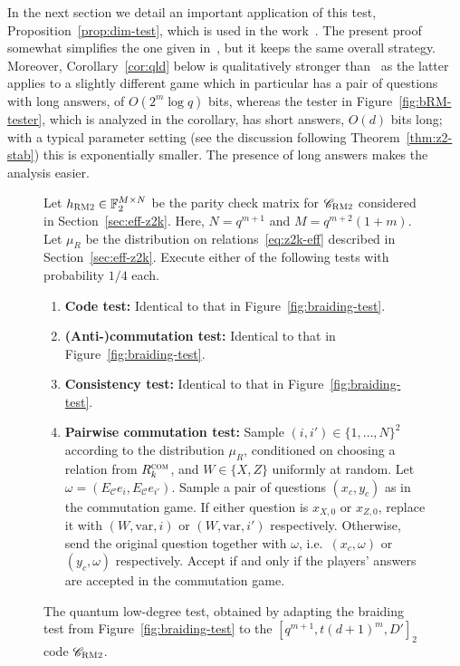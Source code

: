 \documentclass[11pt]{article}
\theoremstyle{definition}
\newcommand{\code}{\mathscr{C}}
\newcommand{\F}{\ensuremath{\mathbb{F}}}
\newcommand{\com}{\textsc{com}}
\newcommand{\bRM}{\ensuremath{\textsc{RM2}}}
\newcommand{\var}{\mathrm{var}}
\newenvironment{gamespec}{
  \begin{mdframed}[style=figstyle]}{
  \end{mdframed}}
\begin{document}
In the next section we detail an important application of this test, Proposition~\ref{prop:dim-test}, which is used in the work~\cite{ji2020mip}. The present proof somewhat simplifies the one given in~\cite{ji2020mip}, but it keeps the same overall strategy. Moreover, Corollary~\ref{cor:qld} below is qualitatively stronger than~\cite[Theorem 7.14]{ji2020mip} as the latter applies to a slightly different game which in particular has a pair of questions with long answers, of $O(2^m\log q)$ bits, whereas the tester in Figure~\ref{fig:bRM-tester}, which is analyzed in the corollary, has short answers, $O(d)$ bits long; with a typical parameter setting (see the discussion following Theorem~\ref{thm:z2-stab}) this is exponentially smaller. The presence of long answers makes the analysis easier.

\begin{figure}[!htbp]
  \centering
  \begin{gamespec}
Let $h_\bRM\in \F_2^{M\times N}$ be the parity check matrix for $\code_\bRM$ considered in Section~\ref{sec:eff-z2k}. Here, $N=q^{m+1}$ and $M=q^{m+2}(1+m)$. Let $\mu_R$ be the distribution on relations~\eqref{eq:z2k-eff} described in Section~\ref{sec:eff-z2k}. Execute either of the following tests with probability $1/4$ each. 
    \begin{enumerate}
      \setlength\itemsep{1pt}
    \item \textbf{Code test:} Identical to that in Figure~\ref{fig:braiding-test}.
    \item \textbf{(Anti-)commutation test:} Identical to that in Figure~\ref{fig:braiding-test}.
		 \item \textbf{Consistency test:} Identical to that in Figure~\ref{fig:braiding-test}.
		\item \textbf{Pairwise commutation test:} Sample $(i,i')\in \{1,\ldots,N\}^2$ according to the distribution $\mu_R$, conditioned on choosing a relation from $R_k^\com$, and $W\in \{X,Z\}$ uniformly at random. 	
		Let $\omega=(E_\code e_{i}, E_\code e_{i'})$. 
		Sample a pair of questions $(x_c,y_c)$ as in the commutation game. If either question is $x_{X,0}$ or $x_{Z,0}$, replace it with $(W,\var,i)$ or $(W,\var,i')$ respectively. Otherwise, send the original question together with $\omega$, i.e.\ $(x_c,\omega)$ or $(y_c,\omega)$ respectively. Accept if and only if the players' answers are accepted in the commutation game.  
    \end{enumerate}
  \end{gamespec}
  \caption{The quantum low-degree test, obtained by adapting the braiding test from Figure~\ref{fig:braiding-test} to the $[q^{m+1},t(d+1)^m,D']_2$ code $\code_\bRM$.}
  \label{fig:pbt}
	
\end{figure}
\end{document}
